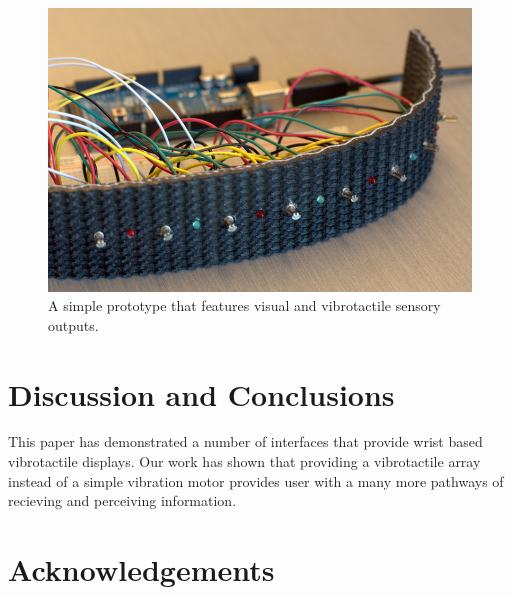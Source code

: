 \documentclass{chi-ext}
\begin{document}
\begin{figure}
  \begin{center}
  \includegraphics[width=\columnwidth]{images/P1130386.jpg}
  \caption{A simple prototype that features visual and vibrotactile sensory outputs.}
  \label{fig:rubberVibeBand01}
  \end{center}  
\end{figure}

\section{Discussion and Conclusions}

This paper has demonstrated a number of interfaces that provide wrist based vibrotactile displays. Our work has shown that providing a vibrotactile array instead of a simple vibration motor provides user with a many more pathways of recieving and perceiving information.


\section{Acknowledgements}
\end{document}
